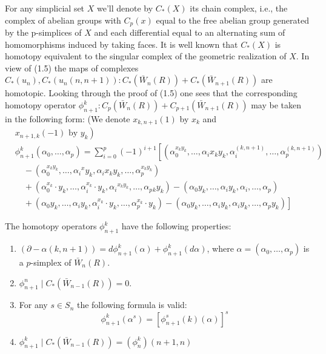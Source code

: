 For any simplicial set $X$ we'll denote by $C_*(X)$ its chain complex, i.e., the complex of abelian groups with $C_p(x)$ equal to the free abelian group generated by the p-simplices of $X$ and each differential equal to an alternating sum of homomorphisms induced by taking faces. It is well known that $C_*(X)$ is homotopy equivalent to the singular complex of the geometric realization of $X$. In view of (1.5) the maps of complexes $C_*\left(u_n\right), C_*\left(u_n(n, n+1)\right): C_*\left(\bar{W}_n(R)\right)+C_*\left(\bar{W}_{n+1}(R)\right)$ are homotopic. Looking through the proof of (1.5) one sees that the corresponding homotopy operator $\phi_{n+1}^k: C_p\left(\bar{W}_n(R)\right)+C_{p+1}\left(\bar{W}_{n+1}(R)\right)$ may be taken in the following form: (We denote $x_{k, n+1}(1)$ by $x_k$ and
$$
\begin{aligned}
& \left.x_{n+1, k}(-1) \text { by } y_k\right) \\
& \phi_{n+1}^k\left(\alpha_0, \ldots, \alpha_p\right)=\sum_{i=0}^p(-1)^{i+1}\left[\left(\alpha_0^{x_k y_k}, \ldots, \alpha_i x_k y_k, \alpha_i^{(k, n+1)}, \ldots, \alpha_p^{(k, n+1)}\right)\right. \\
& \quad-\left(\alpha_0^{x_k y_k}, \ldots, \alpha_i{ }^x y_k, \alpha_i x_k y_k, \ldots, \alpha_p^{x_k y_k}\right) \\
& \quad+\left(\alpha_0^{x_k} \cdot y_k, \ldots, \alpha_i^{x_k} \cdot y_k, \alpha_i{ }^{x_k y_k}, \ldots, \alpha_p{ }_k y_k\right)-\left(\alpha_0 y_k, \ldots, \alpha_i y_k, \alpha_i, \ldots, \alpha_p\right) \\
& \left.\quad+\left(\alpha_0 y_k, \ldots, \alpha_i y_k, \alpha_i^{x_k} \cdot y_k, \ldots, \alpha_p^{x_k} \cdot y_k\right)-\left(\alpha_0 y_k, \ldots, \alpha_i y_k, \alpha_i y_k, \ldots, \alpha_p y_k\right)\right]
\end{aligned}
$$


\begin{lemm}
The homotopy operators $\phi_{n+1}^k$ have the following properties:
    \begin{enumerate}
        \item $(\partial - \alpha(k, n+1))=d \phi_{n+1}^k(\alpha)+\phi_{n+1}^k(d \alpha)$, where $\alpha=\left(\alpha_0, \ldots, \alpha_p\right)$ is a $p$-simplex of $\bar{W}_n(R)$.
        \item $\phi_{n+1}^n \mid C_*\left(\bar{W}_{n-1}(R)\right)=0$.
        \item For any $s \in S_n$ the following formula is valid:
        $$
        \phi_{n+1}^k\left(\alpha^s\right)=\left[\phi_{n+1}^s(k)(\alpha)\right]^s
        $$
        \item $\phi_{n+1}^k \mid C_*\left(\bar{W}_{n-1}(R)\right)=\left(\phi_n^k\right)(n+1, n)$   
    \end{enumerate}
\end{lemm}

